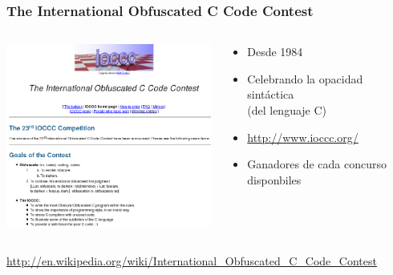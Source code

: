 \begin{frame}[fragile]
\frametitle{The International Obfuscated C Code Contest}

\begin{columns}[T]
\begin{column}{.63\textwidth}
\includegraphics[width=8cm]{figs/obfuscated-ioccc}
\end{column}%
\hfill%
\begin{column}{.36\textwidth}
\begin{itemize}
\item Desde 1984
\item Celebrando la opacidad sintáctica \\
  (del lenguaje C)
\item \url{http://www.ioccc.org/}
\item Ganadores de cada concurso disponbiles
\end{itemize}
\end{column}%
\end{columns}


\begin{flushright}
{\footnotesize
\url{http://en.wikipedia.org/wiki/International_Obfuscated_C_Code_Contest}
}
\end{flushright}
\end{frame}

